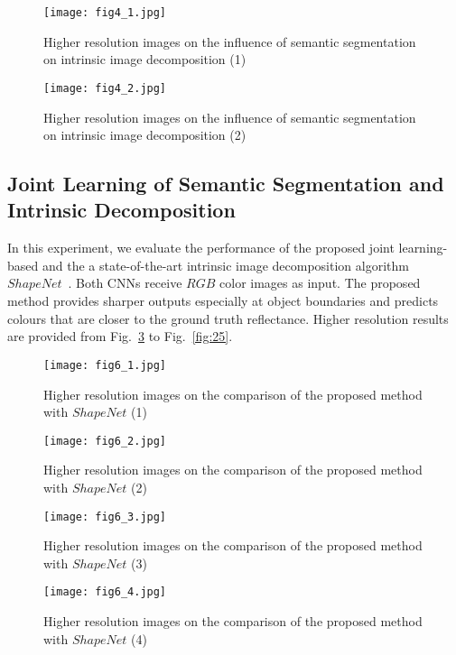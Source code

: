 \documentclass[runningheads]{llncs}
\begin{document}
\begin{figure}[h]
    \centering
    \texttt{[image: fig4\_1.jpg]}
    \caption{Higher resolution images on the influence of semantic segmentation on intrinsic image decomposition (1)}
    \label{fig:11}
\end{figure}

\begin{figure}[h]
    \centering
    \texttt{[image: fig4\_2.jpg]}
    \caption{Higher resolution images on the influence of semantic segmentation on intrinsic image decomposition (2)}
    \label{fig:12}
\end{figure}

\subsection{Joint Learning of Semantic Segmentation and Intrinsic Decomposition}
In this experiment, we evaluate the performance of the proposed joint learning-based and the a state-of-the-art intrinsic image decomposition algorithm $ShapeNet$~. Both CNNs receive $RGB$ color images as input. The proposed method provides sharper outputs especially at object boundaries and predicts colours that are closer to the ground truth reflectance. Higher resolution results are provided from Fig.~\ref{fig:21} to Fig.~\ref{fig:25}.

\begin{figure}[h]
    \centering
    \texttt{[image: fig6\_1.jpg]}
    \caption{Higher resolution images on the comparison of the proposed method with $ShapeNet$ (1)}
    \label{fig:21}
\end{figure}

\begin{figure}[h]
    \centering
    \texttt{[image: fig6\_2.jpg]}
    \caption{Higher resolution images on the comparison of the proposed method with $ShapeNet$ (2)}
    \label{fig:22}
\end{figure}

\begin{figure}[h]
    \centering
    \texttt{[image: fig6\_3.jpg]}
    \caption{Higher resolution images on the comparison of the proposed method with $ShapeNet$ (3)}
    \label{fig:23}
\end{figure}

\begin{figure}[h]
    \centering
    \texttt{[image: fig6\_4.jpg]}
    \caption{Higher resolution images on the comparison of the proposed method with $ShapeNet$ (4)}
    \label{fig:24}
\end{figure}
\end{document}
